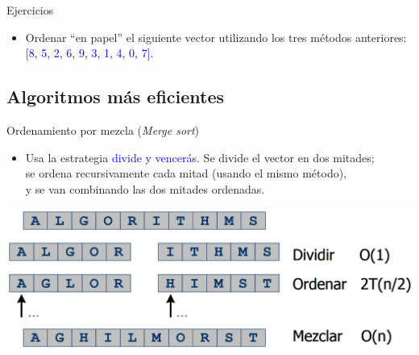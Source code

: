 \documentclass{beamer} %
\newcommand{\blue}[1]{\textcolor{blue}{#1}}
\begin{document}
\begin{frame}{Ejercicios}
    \begin{itemize}
        \item Ordenar ``en papel'' el siguiente vector utilizando los tres métodos anteriores: \blue{[8, 5, 2, 6, 9, 3, 1, 4, 0, 7]}.
    \end{itemize}
\end{frame}

\subsection{Algoritmos más eficientes}

\begin{frame}{Ordenamiento por mezcla ({\em Merge sort})}
    \begin{itemize}
        \item {\footnotesize Usa la estrategia \blue{divide y vencerás}. Se divide el vector en dos mitades;\\ se ordena recursivamente cada mitad (usando el mismo método),\\ y se van combinando las dos mitades ordenadas.}
    \end{itemize}
    \begin{center}
        \includegraphics[width=.9\textwidth]{./image/cap5/merge-sort1.png}
    \end{center}
\end{frame}

\end{document}
